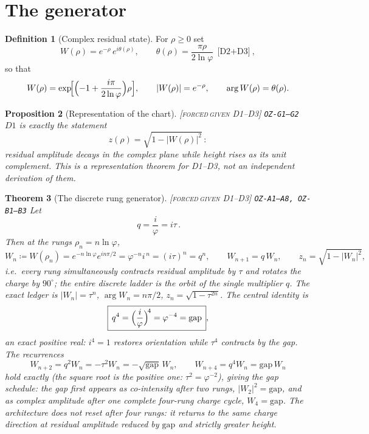 \documentclass[11pt]{article}
\newcommand{\tagFD}{\textcolor{cF}{\textsc{[forced}}\,\textcolor{cD}{\textsc{given D1--D3]}}}
\newcommand{\hx}[1]{\textcolor{cC}{\footnotesize\texttt{#1}}}
\newcommand{\gp}{\varphi}
\newcommand{\gapc}{\mathrm{gap}}
\theoremstyle{plain}
\newtheorem{theorem}{Theorem}[section]
\newtheorem{proposition}[theorem]{Proposition}
\theoremstyle{definition}
\newtheorem{definition}[theorem]{Definition}
\theoremstyle{remark}
\begin{document}
\section{The generator}\label{sec:generator}

\begin{definition}[Complex residual state]\label{def:W}
For $\rho\ge0$ set
\[
W(\rho)=e^{-\rho}\,e^{i\theta(\rho)},\qquad
\theta(\rho)=\frac{\pi\rho}{2\ln\gp}\ \text{[D2$+$D3]},
\]
so that
\[
W(\rho)=\exp\!\Bigl[\Bigl(-1+\frac{i\pi}{2\ln\gp}\Bigr)\rho\Bigr],
\qquad |W(\rho)|=e^{-\rho},\qquad \arg W(\rho)=\theta(\rho).
\]
\end{definition}

\begin{proposition}[Representation of the chart]\label{prop:rep}\tagFD{} \hx{OZ-G1--G2}
$D1$ is exactly the statement
\[
z(\rho)=\sqrt{1-|W(\rho)|^2}\,:
\]
residual amplitude decays in the complex plane while height rises as its unit
complement. This is a representation theorem for D1--D3, not an independent
derivation of them.
\end{proposition}

\begin{theorem}[The discrete rung generator]\label{thm:generator}\tagFD{} \hx{OZ-A1--A8, OZ-B1--B3}
Let
\[
\boxed{\,q=\frac{i}{\gp}=i\tau\,}.
\]
Then at the rungs $\rho_n=n\ln\gp$,
\[
W_n \coloneqq W(\rho_n)=e^{-n\ln\gp}e^{in\pi/2}=\gp^{-n}i^{\,n}=(i\tau)^n=q^n,
\qquad
W_{n+1}=q\,W_n,
\qquad
z_n=\sqrt{1-|W_n|^2},
\]
i.e.\ every rung simultaneously contracts residual amplitude by $\tau$ and
rotates the charge by $90^\circ$; the entire discrete ladder is the orbit of the
single multiplier $q$. The exact ledger is $|W_n|=\tau^n$,
$\arg W_n=n\pi/2$, $z_n=\sqrt{1-\tau^{2n}}$. The central identity is
\[
\boxed{\,q^4=\Bigl(\frac{i}{\gp}\Bigr)^{\!4}=\gp^{-4}=\gapc\,},
\]
an exact positive real: $i^4=1$ restores orientation while $\tau^4$ contracts by
the gap. The recurrences
\[
W_{n+2}=q^2W_n=-\tau^2W_n=-\sqrt{\gapc}\,W_n,
\qquad
W_{n+4}=q^4W_n=\gapc\,W_n
\]
hold exactly (the square root is the positive one: $\tau^2=\gp^{-2}$), giving the
\emph{gap schedule}: the gap first appears as co-intensity after two rungs,
$|W_2|^2=\gapc$, and as complex amplitude after one complete four-rung charge
cycle, $W_4=\gapc$. The architecture does not reset after four rungs: it returns
to the same charge direction at residual amplitude reduced by $\gapc$ and
strictly greater height.
\end{theorem}
\end{document}
